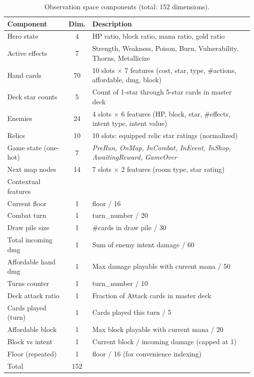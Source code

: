 \begin{table}[htbp]
    \centering
    \caption{Observation space components (total: 152 dimensions).}
    \label{tab:obs_space}
    \begin{tabularx}{\linewidth}{lcX}
        \toprule
        Component & Dim. & Description \\
        \midrule
        Hero state         & 4  & HP ratio, block ratio, mana ratio, gold ratio \\
        Active effects     & 7  & Strength, Weakness, Poison, Burn, Vulnerability, Thorns, Metallicize \\
        Hand cards         & 70 & 10 slots $\times$ 7 features (cost, star, type, \#actions, affordable, dmg, block) \\
        Deck star counts   & 5  & Count of 1-star through 5-star cards in master deck \\
        Enemies            & 24 & 4 slots $\times$ 6 features (HP, block, star, \#effects, intent type, intent value) \\
        Relics             & 10 & 10 slots: equipped relic star ratings (normalized) \\
        Game state (one-hot) & 7 & \textit{PreRun, OnMap, InCombat, InEvent, InShop, AwaitingReward, GameOver} \\
        Next map nodes     & 14 & 7 slots $\times$ 2 features (room type, star rating) \\
        \midrule
        Contextual features & & \\
        Current floor       & 1 & floor / 16 \\
        Combat turn         & 1 & turn\_number / 20 \\
        Draw pile size      & 1 & \#cards in draw pile / 30 \\
        Total incoming dmg  & 1 & Sum of enemy intent damage / 60 \\
        Affordable hand dmg & 1 & Max damage playable with current mana / 50 \\
        Turns counter       & 1 & turn\_number / 10 \\
        Deck attack ratio   & 1 & Fraction of Attack cards in master deck \\
        Cards played (turn) & 1 & Cards played this turn / 5 \\
        Affordable block    & 1 & Max block playable with current mana / 20 \\
        Block vs intent     & 1 & Current block / incoming damage (capped at 1) \\
        Floor (repeated)    & 1 & floor / 16 (for convenience indexing) \\
        \midrule
        Total & 152 & \\
        \bottomrule
    \end{tabularx}
\end{table}

